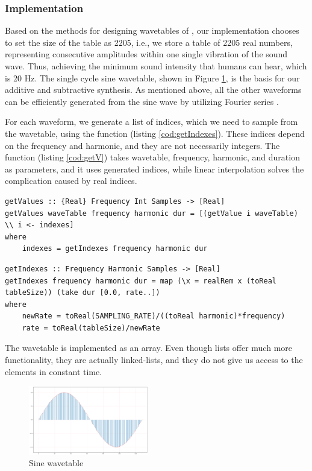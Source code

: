 \documentclass[runningheads]{llncs}
\begin{document}
\subsubsection{Implementation}
Based on the methods for designing wavetables of \cite{organ}, our implementation chooses to set the size of the table as 2205, i.e., we store a table of 2205 real numbers, representing consecutive amplitudes within one single vibration of the sound wave. Thus, achieving the minimum sound intensity that humans can hear, which is 20 Hz.
The single cycle sine wavetable, shown in Figure \ref{fig:wavetable},
is the basis for our additive and subtractive synthesis\label{subractive}. As mentioned above, all the other waveforms can be efficiently generated from the sine wave by utilizing Fourier series \cite{additivesynth}. 

For each waveform, we generate a list of indices, which we need to sample from the wavetable, using the  function (listing \ref{cod:getIndexes}). These indices depend on the frequency and harmonic, and they are not necessarily integers.
The  function (listing \ref{cod:getV}) takes wavetable, frequency, harmonic, and duration as parameters, and it uses generated indices, while linear interpolation solves the complication caused by real indices.

\begin{lstlisting}[language=Clean,label={cod:getV},caption={Function \Cl{getValues}},captionpos=b]
getValues :: {Real} Frequency Int Samples -> [Real]
getValues waveTable frequency harmonic dur = [(getValue i waveTable) \\ i <- indexes]
where
    indexes = getIndexes frequency harmonic dur
\end{lstlisting}

\begin{lstlisting}[language=Clean,label={cod:getIndexes},caption={Function \Cl{getIndexes}},captionpos=b]
getIndexes :: Frequency Harmonic Samples -> [Real]
getIndexes frequency harmonic dur = map (\x = realRem x (toReal tableSize)) (take dur [0.0, rate..])
where
    newRate = toReal(SAMPLING_RATE)/((toReal harmonic)*frequency)
    rate = toReal(tableSize)/newRate
\end{lstlisting} 

The wavetable is implemented as an array. Even though lists offer much more functionality, they are actually linked-lists, and they do not give us access to the elements in constant time.

\begin{figure}[H]
        \centering
        \includegraphics[width=\textwidth/2, height=3cm]{wavetable.png}
        \caption{Sine wavetable}
        \label{fig:wavetable}
\end{figure}
\end{document}
